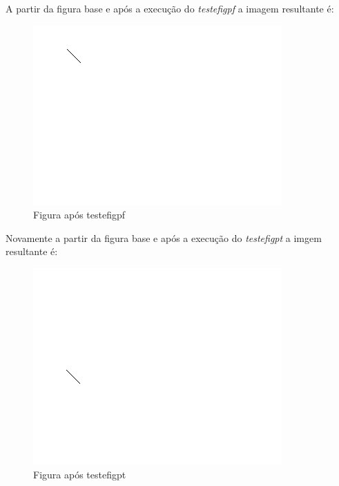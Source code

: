 \documentclass[12pt]{article}
\begin{document}
A partir da figura base e após a execução do \emph{testefigpf} a imagem resultante é:
\begin{figure}[H]
  \includegraphics[width=\linewidth]{02_depois_testefigpf.png}
  \caption{Figura após testefigpf}
\end{figure}

Novamente a partir da figura base e após a execução do \emph{testefigpt} a imgem resultante é:
\begin{figure}[H]
  \includegraphics[width=\linewidth]{03_depois_testefigpt.png}
  \caption{Figura após testefigpt}
\end{figure}
\end{document}
